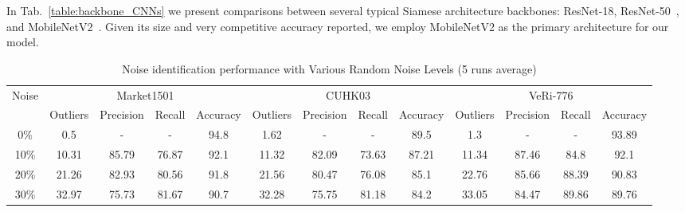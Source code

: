 \documentclass[lettersize,journal]{IEEEtran}
\begin{document}
\vskip 0.15cm
In Tab.~\ref{table:backbone_CNNs} we present comparisons between several typical Siamese architecture backbones: ResNet-18, ResNet-50~\cite{he2016deep}, and MobileNetV2~\cite{sandler2018mobilenetv2}. Given its size and very competitive accuracy reported, we employ MobileNetV2 as the primary architecture for our model.


\begin{table}[t]
\caption{Siamese Backbone Network selection on CUHK03 Dataset with various random noise level (5 runs average)}
\label{table:backbone_CNNs}
\end{table}

\begin{table}[ht]
\centering
\caption{Noise identification performance with Various Random Noise Levels (5 runs average)}
\begin{tabular}{c|cccc|cccc|cccc}
\hline
\multirow{2}{*}{Noise} & \multicolumn{4}{c|}{Market1501} & \multicolumn{4}{c|}{CUHK03} & \multicolumn{4}{c}{VeRi-776} \\ \cline{2-13} 
 & Outliers & Precision & Recall & Accuracy & Outliers & Precision & Recall & Accuracy & Outliers & Precision & Recall & Accuracy \\ \hline
0\% & 0.5 & - & - & 94.8 & 1.62 & - & - & 89.5 & 1.3 & - & - & 93.89 \\
10\% & 10.31 & 85.79 & 76.87 & 92.1 & 11.32 & 82.09 & 73.63 & 87.21 & 11.34 & 87.46 & 84.8 & 92.1 \\
20\% & 21.26 & 82.93 & 80.56 & 91.8 & 21.56 & 80.47 & 76.08 & 85.1 & 22.76 & 85.66 & 88.39 & 90.83 \\
30\% & 32.97 & 75.73 & 81.67 & 90.7 & 32.28 & 75.75 & 81.18 & 84.2 & 33.05 & 84.47 & 89.86 & 89.76 \\ \hline
\end{tabular}
\label{tab:denoising_results}
\end{table}
\end{document}
